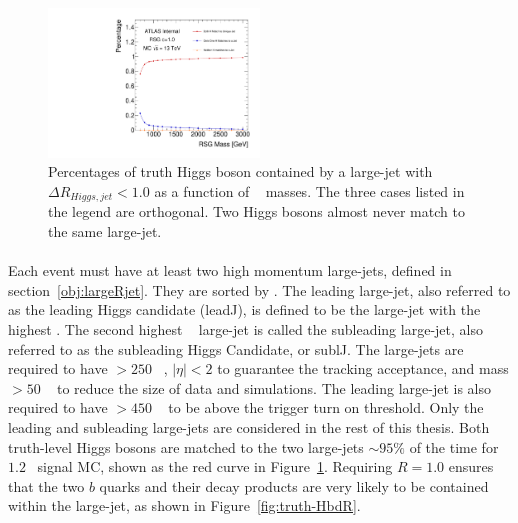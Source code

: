 \begin{figure}[htbp!]
  \begin{center}
  \includegraphics[width=0.5\textwidth,angle=-90]{figures/boosted/Truth/truth_higgs-matching.pdf}
  \caption{Percentages of truth Higgs boson contained by a large-\R jet with $\Delta R_{Higgs, jet}<1.0$ as a function of \Grav~ masses. The three cases listed in the legend are orthogonal. Two Higgs bosons almost never match to the same large-\R jet.}
  \label{fig:truth-Higgs-largeRjet}
\end{center}
\end{figure}

\paragraph{}
Each event must have at least two high momentum large-\R jets, defined in section~\ref{obj:largeRjet}.
They are sorted by \pt.
The leading large-\R jet, also referred to as the leading Higgs candidate (leadJ), is defined to be the large-\R jet with the highest \pt.
The second highest \pt~ large-\R jet is called the subleading large-\R jet, also referred to as the subleading Higgs Candidate, or sublJ.
The large-\R jets are required to have \pt $> 250$ \GeV~, $|\eta| < 2$ to guarantee the tracking acceptance, and mass $> 50$ \GeV~ to reduce the size of data and simulations.
The leading large-\R jet is also required to have \pt $> 450$ \GeV~ to be above the trigger turn on threshold.
Only the leading and subleading large-\R jets are considered in the rest of this thesis.
Both truth-level Higgs bosons are matched to the two large-\R jets $\sim 95\%$ of the time for $1.2$\TeV~ signal MC, shown as the red curve in Figure~\ref{fig:truth-Higgs-largeRjet}. 
Requiring $R = 1.0$ ensures that the two $b$ quarks and their decay products are very likely to be contained within the large-\R jet, as shown in Figure~\ref{fig:truth-HbdR}. 

